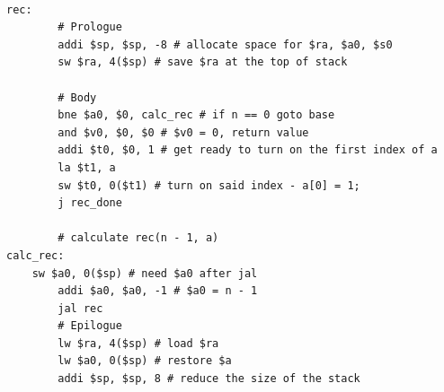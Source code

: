 \documentclass[preview]{standalone}
\begin{document}
\begin{verbatim}

rec:
        # Prologue
        addi $sp, $sp, -8 # allocate space for $ra, $a0, $s0
        sw $ra, 4($sp) # save $ra at the top of stack
        
        # Body
        bne $a0, $0, calc_rec # if n == 0 goto base
        and $v0, $0, $0 # $v0 = 0, return value
        addi $t0, $0, 1 # get ready to turn on the first index of a
        la $t1, a
        sw $t0, 0($t1) # turn on said index - a[0] = 1;
        j rec_done

        # calculate rec(n - 1, a)
calc_rec:
	sw $a0, 0($sp) # need $a0 after jal
        addi $a0, $a0, -1 # $a0 = n - 1
        jal rec
        # Epilogue
        lw $ra, 4($sp) # load $ra
        lw $a0, 0($sp) # restore $a
        addi $sp, $sp, 8 # reduce the size of the stack

\end{verbatim}
\end{document}
